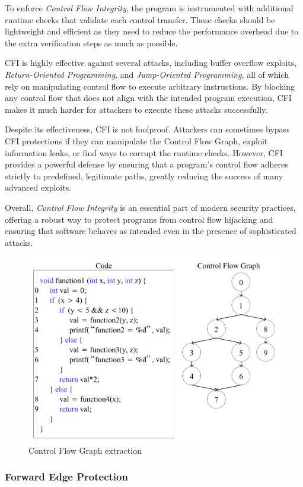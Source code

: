 To enforce \textit{Control Flow Integrity}, the program is instrumented with additional
runtime checks that validate each control transfer. These checks should be
lightweight and efficient as they need to reduce the performance overhead due to
the extra verification steps as much as possible.

CFI is highly effective against several attacks, including buffer overflow exploits,
\textit{Return-Oriented Programming}, and \textit{Jump-Oriented Programming},
all of which rely on manipulating control flow to execute arbitrary instructions.
By blocking any control flow that does not align with the intended program execution,
CFI makes it much harder for attackers to execute these attacks successfully.

Despite its effectiveness, CFI is not foolproof. Attackers can sometimes bypass
CFI protections if they can manipulate the Control Flow Graph, exploit information
leaks, or find ways to corrupt the runtime checks. However, CFI provides a
powerful defense by ensuring that a program's control flow adheres strictly to
predefined, legitimate paths, greatly reducing the success of many advanced
exploits.

Overall, \textit{Control Flow Integrity} is an essential part of modern security
practices, offering a robust way to protect programs from control flow hijacking
and ensuring that software behaves as intended even in the presence of sophisticated
attacks.

\begin{figure}
  \centering
  \includegraphics[width=.6\linewidth]{images/cfg.png}
  \caption{Control Flow Graph extraction}
  \label{fig:cfg}
\end{figure}

\subsubsection{Forward Edge Protection}
\label{subsubsec:background_forward}

